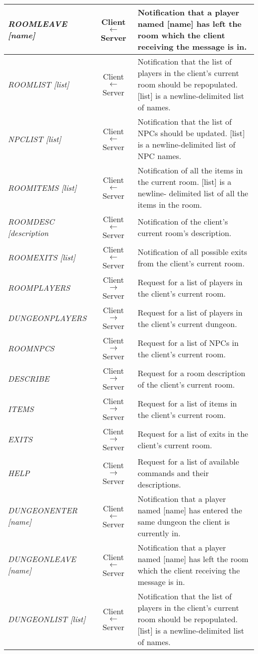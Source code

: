 \documentclass[a4paper]{article}
\begin{document}
\begin{longtable}{|l|c|p{8 cm}|}
\hline
\textit{ROOMLEAVE [name]} & Client $\leftarrow$ Server & Notification that a player named [name] has left the room which the client receiving the message is in.\\
\hline
\textit{ROOMLIST [list]} & Client $\leftarrow$ Server & Notification that the list of players in the client's current room should be repopulated. [list] is a newline-delimited list of names.\\
\hline
\textit{NPCLIST [list]}  & Client $\leftarrow$ Server & Notification that the list of NPCs should be updated. [list] is a newline-delimited list of NPC names.\\
\hline
\textit{ROOMITEMS [list]} & Client $\leftarrow$ Server & Notification of all the items in the current room. [list] is a newline- delimited list of all the items in the room.\\
\hline
\textit{ROOMDESC [description} & Client $\leftarrow$ Server & Notification of the client's current room's description.\\
\hline
\textit{ROOMEXITS [list]} & Client $\leftarrow$ Server & Notification of all possible exits from the client's current room.\\
\hline
\textit{ROOMPLAYERS} & Client $\rightarrow$ Server & Request for a list of players in the client's current room.\\
\hline
\textit{DUNGEONPLAYERS} & Client $\rightarrow$ Server & Request for a list of players in the client's current dungeon.\\
\hline
\textit{ROOMNPCS} & Client $\rightarrow$ Server & Request for a list of NPCs in the client's current room.\\
\hline
\textit{DESCRIBE} & Client $\rightarrow$ Server & Request for a room description of the client's current room.\\
\hline
\textit{ITEMS} & Client $\rightarrow$ Server & Request for a list of items in the client's current room.\\
\hline
\textit{EXITS} & Client $\rightarrow$ Server & Request for a list of exits in the client's current room.\\
\hline
\textit{HELP} & Client $\rightarrow$ Server & Request for a list of available commands and their descriptions.\\
\hline
\textit{DUNGEONENTER [name]} & Client $\leftarrow$ Server & Notification that a player named [name] has entered the same dungeon the client is currently in.\\
\hline
\textit{DUNGEONLEAVE [name]} & Client $\leftarrow$ Server & Notification that a player named [name] has left the room which the client receiving the message is in.\\
\hline
\textit{DUNGEONLIST [list]} & Client $\leftarrow$ Server & Notification that the list of players in the client's current room should be repopulated. [list] is a newline-delimited list of names.\\
\hline
\end{longtable}
\end{document}
